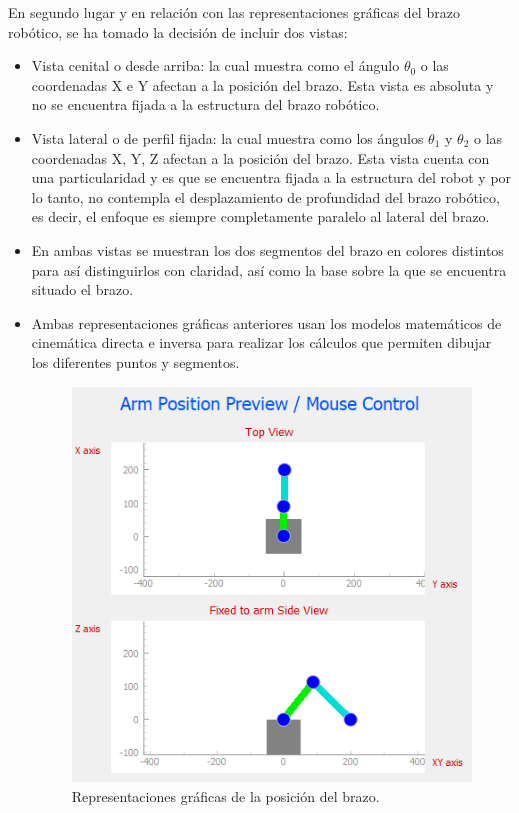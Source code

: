 En segundo lugar y en relación con las representaciones gráficas del brazo robótico, se ha tomado la decisión de incluir dos vistas:
    \begin{itemize}
        \item Vista cenital o desde arriba: la cual muestra como el ángulo $\theta_{0}$ o las coordenadas X e Y afectan a la posición del brazo. Esta vista es absoluta y no se encuentra fijada a la estructura del brazo robótico.
        \item Vista lateral o de perfil fijada: la cual muestra como los ángulos $\theta_{1}$ y $\theta_{2}$ o las coordenadas X, Y, Z afectan a la posición del brazo. Esta vista cuenta con una particularidad y es que se encuentra fijada a la estructura del robot y por lo tanto, no contempla el desplazamiento de profundidad del brazo robótico, es decir, el enfoque es siempre completamente paralelo al lateral del brazo. 
        \item En ambas vistas se muestran los dos segmentos del brazo en colores distintos para  así distinguirlos con claridad, así como la base sobre la que se encuentra situado el brazo.
         \item Ambas representaciones gráficas anteriores usan los modelos matemáticos de cinemática directa e inversa para realizar los cálculos que permiten dibujar los diferentes puntos y segmentos.
        \begin{figure}[H]
            \centering
            \includegraphics[width=0.55\linewidth]{pictures/Views_GUI.PNG}
            \caption{Representaciones gráficas de la posición del brazo.}
            \label{fig:ui_views}
         \end{figure}
    \end{itemize}
    
